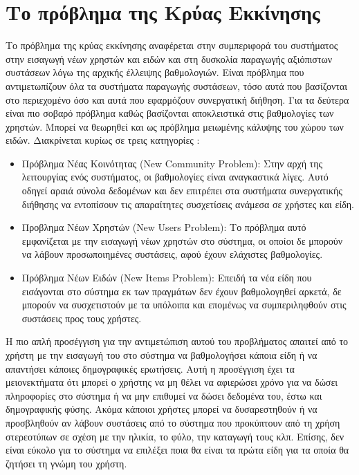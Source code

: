 \section{Το πρόβλημα της Κρύας Εκκίνησης} 
Το πρόβλημα της κρύας εκκίνησης αναφέρεται στην συμπεριφορά του συστήματος στην εισαγωγή νέων χρηστών και ειδών και στη δυσκολία παραγωγής αξιόπιστων συστάσεων λόγω της αρχικής έλλειψης βαθμολογιών. Είναι πρόβλημα που αντιμετωπίζουν όλα τα συστήματα παραγωγής συστάσεων, τόσο αυτά που βασίζονται στο περιεχομένο όσο και αυτά που εφαρμόζουν συνεργατική διήθηση. Για τα δεύτερα είναι πιο σοβαρό πρόβλημα καθώς βασίζονται αποκλειστικά στις βαθμολογίες των χρηστών. Μπορεί να θεωρηθεί και ως πρόβλημα μειωμένης κάλυψης του χώρου των ειδών.\cite{ricci2011recommender} Διακρίνεται κυρίως σε τρεις κατηγορίες \cite{Nikolakopoulos2015126}: 
\begin{itemize}
 \item Πρόβλημα Νέας Κοινότητας ({\en New Community Problem}): Στην αρχή της λειτουργίας ενός συστήματος, οι βαθμολογίες είναι αναγκαστικά λίγες. Αυτό οδηγεί αραιά σύνολα δεδομένων και δεν επιτρέπει στα συστήματα συνεργατικής διήθησης να εντοπίσουν τις απαραίτητες συσχετίσεις ανάμεσα σε χρήστες και είδη.
 \item Προβλημα Νέων Χρηστών ({\en New Users Problem}): Το πρόβλημα αυτό εμφανίζεται με την εισαγωγή νέων χρηστών στο σύστημα, οι οποίοι δε μπορούν να λάβουν προσωποιημένες συστάσεις, αφού έχουν ελάχιστες βαθμολογίες.
 \item Πρόβλημα Νέων Ειδών ({\en New Items Problem}): Επειδή τα νέα είδη που εισάγονται στο σύστημα εκ των πραγμάτων δεν έχουν βαθμολογηθεί αρκετά, δε μπορούν να συσχετιστούν με τα υπόλοιπα και επομένως να συμπεριληφθούν στις συστάσεις προς τους χρήστες. 
\end{itemize}\par
Η πιο απλή προσέγγιση για την αντιμετώπιση αυτού του προβλήματος απαιτεί από το χρήστη με την εισαγωγή του στο σύστημα να βαθμολογήσει κάποια είδη ή να απαντήσει κάποιες δημογραφικές ερωτήσεις. Αυτή η προσέγγιση έχει τα μειονεκτήματα ότι μπορεί ο χρήστης να μη θέλει να αφιερώσει χρόνο για να δώσει πληροφορίες στο σύστημα ή να μην επιθυμεί να δώσει δεδομένα του, έστω και δημογραφικής φύσης. Ακόμα κάποιοι χρήστες μπορεί να δυσαρεστηθούν ή να προσβληθούν αν λάβουν συστάσεις από το σύστημα που προκύπτουν από τη χρήση στερεοτύπων σε σχέση με την ηλικία, το φύλο, την καταγωγή τους κλπ.\cite{ricci2011recommender} Επίσης, δεν είναι εύκολο για το σύστημα να επιλέξει ποια θα είναι τα πρώτα είδη για τα οποία θα ζητήσει τη γνώμη του χρήστη.\par
